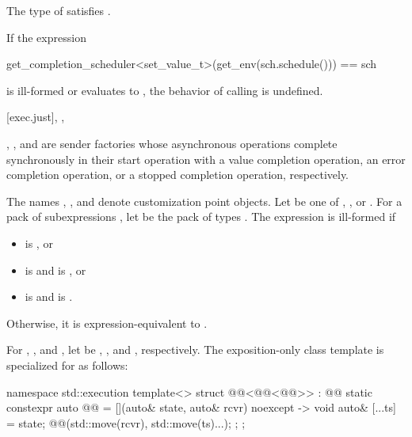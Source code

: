 \pnum
\mandates
The type of  satisfies .

\pnum
If the expression
\begin{codeblock}
get_completion_scheduler<set_value_t>(get_env(sch.schedule())) == sch
\end{codeblock}
is ill-formed or evaluates to ,
the behavior of calling  is undefined.

[exec.just]{, , }

\pnum
{}, , and  are sender factories
whose asynchronous operations complete synchronously in their start operation
with a value completion operation,
an error completion operation, or
a stopped completion operation, respectively.

\pnum
The names , , and  denote
customization point objects.
Let  be one of
, , or .
For a pack of subexpressions ,
let  be the pack of types .
The expression  is ill-formed if
\begin{itemize}
\item
{} is , or
\item
{} is  and
 is , or
\item
{} is  and
 is .
\end{itemize}

Otherwise, it is expression-equivalent to
.

For , , and ,
let  be
, , and , respectively.
The exposition-only class template 
is specialized for  as follows:
\begin{codeblock}
namespace std::execution {
  template<>
  struct @@<@@<@@>> : @@ {
    static constexpr auto @@ =
      [](auto& state, auto& rcvr) noexcept -> void {
        auto& [...ts] = state;
        @@(std::move(rcvr), std::move(ts)...);
      };
  };
}
\end{codeblock}

